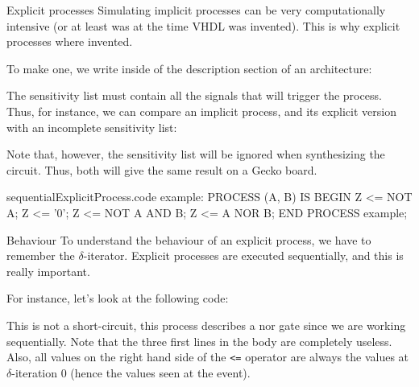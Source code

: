 \documentclass[a4paper]{article}
\begin{document}
\begin{parag}{Explicit processes}
    Simulating implicit processes can be very computationally intensive (or at least was at the time VHDL was invented). This is why explicit processes where invented.

    To make one, we write inside of the description section of an architecture:
    
    The sensitivity list must contain all the signals that will trigger the process. Thus, for instance, we can compare an implicit process, and its explicit version with an incomplete sensitivity list:

    Note that, however, the sensitivity list will be ignored when synthesizing the circuit. Thus, both will give the same result on a Gecko board.
\end{parag}

\begin{filecontents*}[overwrite]{sequentialExplicitProcess.code}
example: PROCESS (A, B) IS
BEGIN
    Z <= NOT A;
    Z <= '0';
    Z <= NOT A AND B;
    Z <= A NOR B;
END PROCESS example;
\end{filecontents*}

\begin{parag}{Behaviour}
    To understand the behaviour of an explicit process, we have to remember the $\delta$-iterator. Explicit processes are executed sequentially, and this is really important.

    For instance, let's look at the following code:

    This is not a short-circuit, this process describes a nor gate since we are working sequentially. Note that the three first lines in the body are completely useless. Also, all values on the right hand side of the \texttt{<=} operator are always the values at $\delta$-iteration 0 (hence the values seen at the event).
\end{parag}
\end{document}
